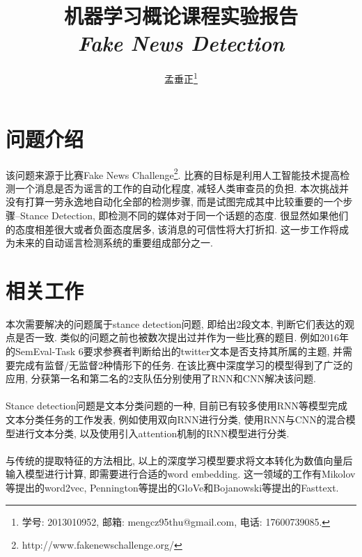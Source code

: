 \documentclass[a4paper]{article}
\title{机器学习概论课程实验报告\\\textit{Fake News Detection}}
\author{孟垂正\footnote{学号: 2013010952, 邮箱: mengcz95thu@gmail.com, 电话: 17600739085.}}
\date{\zhtoday}
\begin{document}
	\maketitle\thispagestyle{empty}
	\renewcommand{\contentsname}{目录}
	\tableofcontents
	\clearpage
	
	\setcounter{page}{1}
	\section{问题介绍}
	该问题来源于比赛Fake News Challenge\footnote{http://www.fakenewschallenge.org/}. 比赛的目标是利用人工智能技术提高检测一个消息是否为谣言的工作的自动化程度, 减轻人类审查员的负担. 本次挑战并没有打算一劳永逸地自动化全部的检测步骤, 而是试图完成其中比较重要的一个步骤--Stance Detection, 即检测不同的媒体对于同一个话题的态度. 很显然如果他们的态度相差很大或者负面态度居多, 该消息的可信性将大打折扣. 这一步工作将成为未来的自动谣言检测系统的重要组成部分之一.

	\section{相关工作}
	本次需要解决的问题属于stance detection问题, 即给出2段文本, 判断它们表达的观点是否一致. 类似的问题之前也被数次提出过并作为一些比赛的题目. 例如2016年的SemEval-Task 6要求参赛者判断给出的twitter文本是否支持其所属的主题, 并需要完成有监督/无监督2种情形下的任务\cite{mohammad2016semeval}. 在该比赛中深度学习的模型得到了广泛的应用, 分获第一名和第二名的2支队伍分别使用了RNN\cite{zarrella2016mitre}和CNN\cite{wei2016pkudblab}解决该问题.\\\\
	Stance detection问题是文本分类问题的一种, 目前已有较多使用RNN等模型完成文本分类任务的工作发表, 例如使用双向RNN进行分类\cite{graves2005framewise}, 使用RNN与CNN的混合模型进行文本分类\cite{lai2015recurrent}, 以及使用引入attention机制的RNN模型进行分类\cite{luong2015effective}\cite{chen2016thorough}.\\\\
	与传统的提取特征的方法相比, 以上的深度学习模型要求将文本转化为数值向量后输入模型进行计算, 即需要进行合适的word embedding. 这一领域的工作有Mikolov等提出的word2vec\cite{mikolov2013distributed}, Pennington等提出的GloVe\cite{pennington2014glove}和Bojanowski等提出的Fasttext\cite{bojanowski2016enriching}.
	
\end{document}
